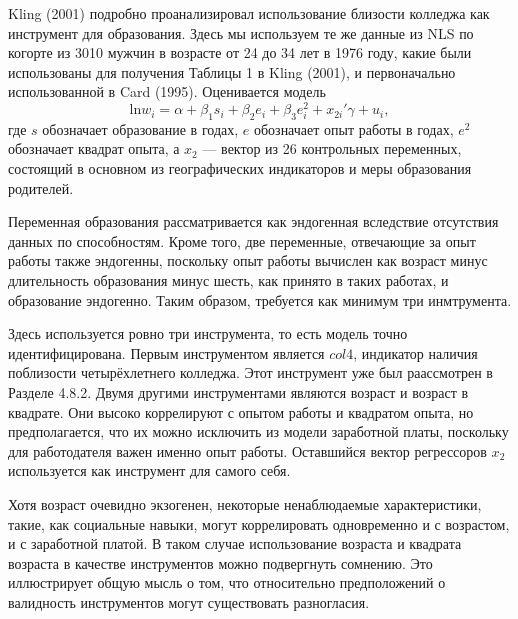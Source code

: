 Kling (2001) подробно проанализировал использование близости колледжа как инструмент для образования. Здесь мы используем те же данные из NLS по когорте из 3010 мужчин в возрасте от 24 до 34 лет в 1976 году, какие были использованы для получения Таблицы 1 в Kling (2001), и первоначально использованной в Card (1995). Оценивается модель
$$
\mathrm{ln} w_i = \alpha + \beta_1 s_i + \beta_2 e_i + \beta_3 e_i^2 + x_{2i}'\gamma+u_i,
$$
где $s$ обозначает образование в годах, $e$ обозначает опыт работы в годах, $e^2$ обозначает квадрат опыта, а $x_2$ --- вектор из 26 контрольных переменных, состоящий в основном из географических индикаторов и меры образования родителей.

Переменная образования рассматривается как эндогенная вследствие отсутствия данных по способностям. Кроме того, две переменные, отвечающие за опыт работы также эндогенны, поскольку опыт работы вычислен как возраст минус длительность образования минус шесть, как принято в таких работах, и образование эндогенно. Таким образом, требуется как минимум три инмтрумента.

Здесь используется ровно три инструмента, то есть модель точно идентифицирована. Первым инструментом является $col4$, индикатор наличия поблизости четырёхлетнего колледжа. Этот инструмент уже был раассмотрен в Разделе 4.8.2. Двумя другими инструментами являются возраст и возраст в квадрате. Они высоко коррелируют с опытом работы и квадратом опыта, но предполагается, что их можно исключить из модели заработной платы, поскольку для работодателя важен именно опыт работы. Оставшийся вектор регрессоров $x_2$ используется как инструмент для самого себя. 

Хотя возраст очевидно экзогенен, некоторые ненаблюдаемые характеристики, такие, как социальные навыки, могут коррелировать одновременно и с возрастом, и с заработной платой. В таком случае использование возраста и квадрата возраста в качестве инструментов можно подвергнуть сомнению. Это иллюстрирует общую мысль о том, что относительно предположений о валидность инструментов могут существовать разногласия.

